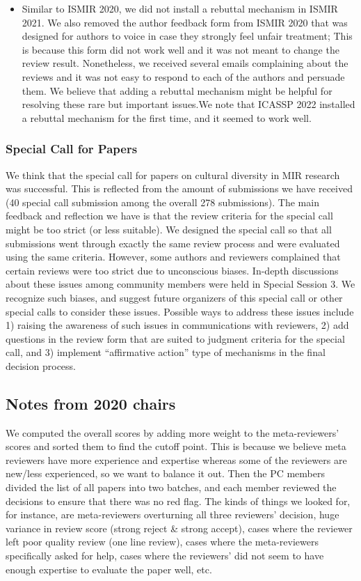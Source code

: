\documentclass[%
10pt,								%
]
{scrartcl}
\begin{document}
\begin{itemize}
                \item   Similar to ISMIR 2020, we did not install a rebuttal mechanism in ISMIR 2021. We also removed the author feedback form from ISMIR 2020 that was designed for authors to voice in case they strongly feel unfair treatment; This is because this form did not work well and it was not meant to change the review result. Nonetheless, we received several emails complaining about the reviews and it was not easy to respond to each of the authors and persuade them. We believe that adding a rebuttal mechanism might be helpful for resolving these rare but important issues.We note that ICASSP 2022 installed a rebuttal mechanism for the first time, and it seemed to work well.
            \end{itemize}
        
        \subsubsection{Special Call for Papers}
            We think that the special call for papers on cultural diversity in MIR research was successful. This is reflected from the amount of submissions we have received (40 special call submission among the overall 278 submissions). The main feedback and reflection we have is that the review criteria for the special call might be too strict (or less suitable). We designed the special call so that all submissions went through exactly the same review process and were evaluated using the same criteria. However, some authors and reviewers complained that certain reviews were too strict due to unconscious biases. In-depth discussions about these issues among community members were held in Special Session 3. We recognize such biases, and suggest future organizers of this special call or other special calls to consider these issues. Possible ways to address these issues include 1) raising the awareness of such issues in communications with reviewers, 2) add questions in the review form that are suited to judgment criteria for the special call, and 3) implement “affirmative action” type of mechanisms in the final decision process.

        \subsection{Notes from 2020 chairs}
            We computed the overall scores by adding more weight to the meta-reviewers' scores and sorted them to find the cutoff point. This is because we believe meta reviewers have more experience and expertise whereas some of the reviewers are new/less experienced, so we want to balance it out.
            Then the PC members divided the list of all papers into two batches, and each member reviewed the decisions to ensure that there was no red flag. The kinds of things we looked for, for instance, are meta-reviewers overturning all three reviewers' decision, huge variance in review score (strong reject \& strong accept), cases where the reviewer left poor quality review (one line review), cases where the meta-reviewers specifically asked for help, cases where the reviewers' did not seem to have enough expertise to evaluate the paper well, etc.
\end{document}
